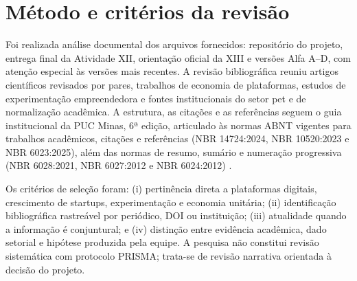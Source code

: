 \section{Método e critérios da revisão}
Foi realizada análise documental dos arquivos fornecidos: repositório do projeto, entrega final da Atividade XII, orientação oficial da XIII e versões Alfa A--D, com atenção especial às versões mais recentes. A revisão bibliográfica reuniu artigos científicos revisados por pares, trabalhos de economia de plataformas, estudos de experimentação empreendedora e fontes institucionais do setor pet e de normalização acadêmica. A estrutura, as citações e as referências seguem o guia institucional da PUC Minas, 6ª edição, articulado às normas ABNT vigentes para trabalhos acadêmicos, citações e referências (NBR 14724:2024, NBR 10520:2023 e NBR 6023:2025), além das normas de resumo, sumário e numeração progressiva (NBR 6028:2021, NBR 6027:2012 e NBR 6024:2012) \cite{pucmanual2025}.

Os critérios de seleção foram: (i) pertinência direta a plataformas digitais, crescimento de startups, experimentação e economia unitária; (ii) identificação bibliográfica rastreável por periódico, DOI ou instituição; (iii) atualidade quando a informação é conjuntural; e (iv) distinção entre evidência acadêmica, dado setorial e hipótese produzida pela equipe. A pesquisa não constitui revisão sistemática com protocolo PRISMA; trata-se de revisão narrativa orientada à decisão do projeto.
